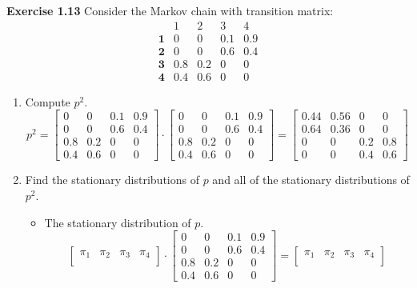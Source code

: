 \documentclass[12pt]{article}
\begin{document}
\newpage
\noindent 
\textbf{Exercise 1.13} Consider the Markov chain with transition matrix:
$$
\begin{matrix}
    &1&2&3&4\\
    \textbf{1}&0&0&0.1&0.9\\
    \textbf{2}&0&0&0.6&0.4\\
    \textbf{3}&0.8&0.2&0&0\\
    \textbf{4}&0.4&0.6&0&0
\end{matrix}
$$
\begin{enumerate}[label=(\alph*)]
    \item Compute $p^2$.
    $$ p^2 =
    \begin{bmatrix}
        0&0&0.1&0.9\\
        0&0&0.6&0.4\\
        0.8&0.2&0&0\\
        0.4&0.6&0&0
    \end{bmatrix}
    \cdot 
    \begin{bmatrix}
        0&0&0.1&0.9\\
        0&0&0.6&0.4\\
        0.8&0.2&0&0\\
        0.4&0.6&0&0
    \end{bmatrix}
    =
    \begin{bmatrix}
        0.44&0.56&0&0\\
        0.64&0.36&0&0\\
        0&0&0.2&0.8\\
        0&0&0.4&0.6
    \end{bmatrix}
    $$
    \item Find the stationary distributions of $p$ and all of the stationary distributions of $p^2$.
    
        \begin{itemize}
            \item The stationary distribution of $p$.\\
            $$
             \begin{bmatrix}
                \pi_1&\pi_2&\pi_3&\pi_4\\
            \end{bmatrix}
            \cdot 
            \begin{bmatrix}
                0&0&0.1&0.9\\
                0&0&0.6&0.4\\
                0.8&0.2&0&0\\
                0.4&0.6&0&0
            \end{bmatrix}
            =
            \begin{bmatrix}
                \pi_1&\pi_2&\pi_3&\pi_4\\
            \end{bmatrix}   
            $$
            

\end{itemize}
\end{enumerate}
\end{document}

